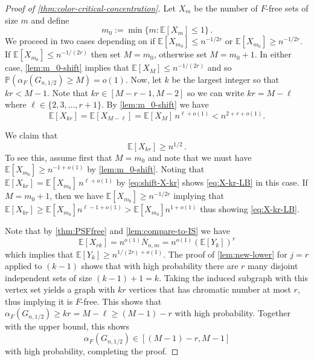 \documentclass[11pt]{article}
\theoremstyle{definition}
\theoremstyle{remark}
\newcommand{\E}{\mathbb{E}}
\newcommand{\PP}{\mathbb{P}}
\begin{document}
\begin{proof}[Proof of \cref{thm:color-critical-concentration}]
    Let $X_m$ be the number of $F$-free sets of size $m$ and define 
    $$m_0 := \min\{ m : \E [X_m] \leq 1\}\,.$$ We proceed in two cases depending on if $\E[ X_{m_0} ] \leq n^{-1/{2r}}$ or $\E[ X_{m_0}] \geq n^{-1/{2r}}.$  If $\E[ X_{m_0} ] \leq n^{-1/(2r)}$ then set $M = m_0$, otherwise set $M = m_0 + 1.$  In either case, \cref{lem:m_0-shift} implies that $\E[X_M] \leq n^{-1/(2r)}$ and so $\PP(\alpha_F(G_{n,1/2}) \geq M) = o(1)$.  Now, let $k$ be the largest integer so that $kr < M - 1$.  Note that $kr \in [M- r-1, M - 2]$ so we can write $kr=M-\ell$ where $ \ell \in \{2,3,\ldots,r+1\}$.  By \cref{lem:m_0-shift} we have 
 \begin{equation}\label{eq:shift-X-kr}
 \E[X_{kr}] = \E[X_{M-\ell}] = \E[X_{M}] \,n^{\ell+o(1)} < n^{2 + r+o(1)}.
 \end{equation}

    We claim that \begin{equation}\label{eq:X-kr-LB}
        \E[X_{kr}] \geq n^{1/2} \,.
    \end{equation}
    To see this, assume first that $M = m_0$ and note that we must have $\E[X_{m_0}] \geq n^{-1 + o(1)}$ by \cref{lem:m_0-shift}.  Noting that $\E[X_{kr}] = \E[X_{m_0}]\, n^{\ell+o(1)}$ by \eqref{eq:shift-X-kr} shows \eqref{eq:X-kr-LB} in this case.  If  $M = m_0+1$, then we have $\E[X_{m_0}] \geq n^{-1/2r}$ implying that $\E[X_{kr}] \geq \E[X_{m_0}] n^{\ell-1 + o(1)}>
    \E[X_{m_0}] n^{1 + o(1)}$ thus showing \eqref{eq:X-kr-LB}.
    


    Note that by \cref{thm:PSFfree} and \cref{lem:compare-to-IS} we have $$\E[X_{rk}] = n^{o(1)} \overline{N}_{n,m} = n^{o(1)} (\E[Y_k])^r$$
    which implies that $\E[Y_k] \geq n^{1/(2r) + o(1)}.$  The proof of \cref{lem:new-lower} for $j = r$ applied to $(k-1)$ shows that with high probability there are $r$ many disjoint independent sets of size $(k-1) + 1 = k$.  Taking the induced subgraph with this vertex set yields a graph with  $kr$ vertices that has chromatic number at most $r$, thus implying it is $F$-free.  This shows that $\alpha_F(G_{n,1/2}) \geq kr= M -\ell \ge (M-1) -r$ with high probability.  Together with the upper bound, this shows $$\alpha_F(G_{n,1/2}) \in [(M-1) -r, M-1]$$ with high probability, completing the proof.
\end{proof}                                                                                                    
\end{document}
